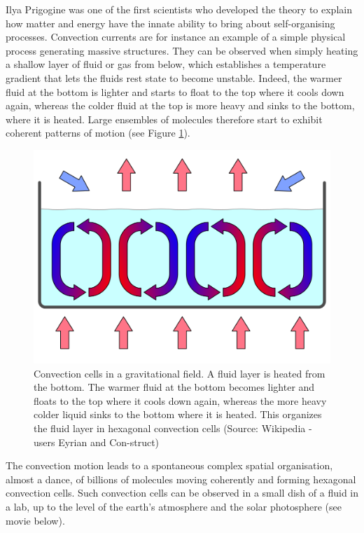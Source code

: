 \documentclass[
  11pt,
]{book}
\begin{document}
Ilya Prigogine was one of the first scientists who developed the theory to explain how matter and energy have the innate ability to bring about self-organising processes. Convection currents are for instance an example of a simple physical process generating massive structures. They can be observed when simply heating a shallow layer of fluid or gas from below, which establishes a temperature gradient that lets the fluids rest state to become unstable. Indeed, the warmer fluid at the bottom is lighter and starts to float to the top where it cools down again, whereas the colder fluid at the top is more heavy and sinks to the bottom, where it is heated. Large ensembles of molecules therefore start to exhibit coherent patterns of motion (see Figure \ref{fig:convectionCells}).

\begin{figure}

{\centering \includegraphics[width=0.8\linewidth]{./figs/convection_cells} 

}

\caption{Convection cells in a gravitational field. A fluid layer is heated from the bottom. The warmer fluid at the bottom becomes lighter and floats to the top where it cools down again, whereas the more heavy colder liquid sinks to the bottom where it is heated. This organizes the fluid layer in hexagonal convection cells (Source: Wikipedia - users Eyrian and Con-struct)}\label{fig:convectionCells}
\end{figure}

The convection motion leads to a spontaneous complex spatial organisation, almost a dance, of billions of molecules moving coherently and forming hexagonal convection cells. Such convection cells can be observed in a small dish of a fluid in a lab, up to the level of the earth's atmosphere and the solar photosphere (see movie below).
\end{document}
